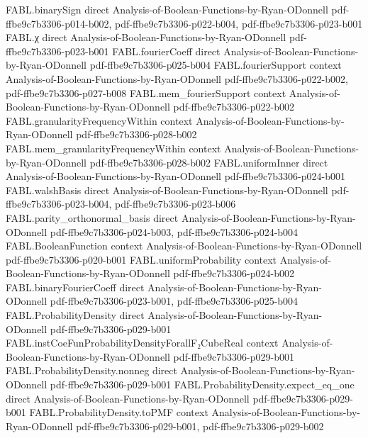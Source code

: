 \begin{theorem}
  {FABL.binarySign}
  {direct}
  {Analysis-of-Boolean-Functions-by-Ryan-ODonnell}
  {pdf-ffbe9c7b3306-p014-b002,
    pdf-ffbe9c7b3306-p022-b004,
    pdf-ffbe9c7b3306-p023-b001}
\proofstep
  {FABL.χ}
  {direct}
  {Analysis-of-Boolean-Functions-by-Ryan-ODonnell}
  {pdf-ffbe9c7b3306-p023-b001}
\proofstep
  {FABL.fourierCoeff}
  {direct}
  {Analysis-of-Boolean-Functions-by-Ryan-ODonnell}
  {pdf-ffbe9c7b3306-p025-b004}
\proofstep
  {FABL.fourierSupport}
  {context}
  {Analysis-of-Boolean-Functions-by-Ryan-ODonnell}
  {pdf-ffbe9c7b3306-p022-b002,
    pdf-ffbe9c7b3306-p027-b008}
\proofstep
  {FABL.mem_fourierSupport}
  {context}
  {Analysis-of-Boolean-Functions-by-Ryan-ODonnell}
  {pdf-ffbe9c7b3306-p022-b002}
\proofstep
  {FABL.granularityFrequencyWithin}
  {context}
  {Analysis-of-Boolean-Functions-by-Ryan-ODonnell}
  {pdf-ffbe9c7b3306-p028-b002}
\proofstep
  {FABL.mem_granularityFrequencyWithin}
  {context}
  {Analysis-of-Boolean-Functions-by-Ryan-ODonnell}
  {pdf-ffbe9c7b3306-p028-b002}
\proofstep
  {FABL.uniformInner}
  {direct}
  {Analysis-of-Boolean-Functions-by-Ryan-ODonnell}
  {pdf-ffbe9c7b3306-p024-b001}
\proofstep
  {FABL.walshBasis}
  {direct}
  {Analysis-of-Boolean-Functions-by-Ryan-ODonnell}
  {pdf-ffbe9c7b3306-p023-b004,
    pdf-ffbe9c7b3306-p023-b006}
\proofstep
  {FABL.parity_orthonormal_basis}
  {direct}
  {Analysis-of-Boolean-Functions-by-Ryan-ODonnell}
  {pdf-ffbe9c7b3306-p024-b003,
    pdf-ffbe9c7b3306-p024-b004}
\proofstep
  {FABL.BooleanFunction}
  {context}
  {Analysis-of-Boolean-Functions-by-Ryan-ODonnell}
  {pdf-ffbe9c7b3306-p020-b001}
\proofstep
  {FABL.uniformProbability}
  {context}
  {Analysis-of-Boolean-Functions-by-Ryan-ODonnell}
  {pdf-ffbe9c7b3306-p024-b002}
\proofstep
  {FABL.binaryFourierCoeff}
  {direct}
  {Analysis-of-Boolean-Functions-by-Ryan-ODonnell}
  {pdf-ffbe9c7b3306-p023-b001,
    pdf-ffbe9c7b3306-p025-b004}
\proofstep
  {FABL.ProbabilityDensity}
  {direct}
  {Analysis-of-Boolean-Functions-by-Ryan-ODonnell}
  {pdf-ffbe9c7b3306-p029-b001}
\proofstep
  {FABL.instCoeFunProbabilityDensityForallF₂CubeReal}
  {context}
  {Analysis-of-Boolean-Functions-by-Ryan-ODonnell}
  {pdf-ffbe9c7b3306-p029-b001}
\proofstep
  {FABL.ProbabilityDensity.nonneg}
  {direct}
  {Analysis-of-Boolean-Functions-by-Ryan-ODonnell}
  {pdf-ffbe9c7b3306-p029-b001}
\proofstep
  {FABL.ProbabilityDensity.expect_eq_one}
  {direct}
  {Analysis-of-Boolean-Functions-by-Ryan-ODonnell}
  {pdf-ffbe9c7b3306-p029-b001}
\proofstep
  {FABL.ProbabilityDensity.toPMF}
  {context}
  {Analysis-of-Boolean-Functions-by-Ryan-ODonnell}
  {pdf-ffbe9c7b3306-p029-b001,
    pdf-ffbe9c7b3306-p029-b002}

\end{theorem}
